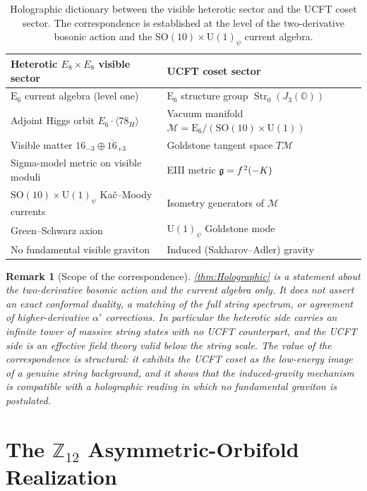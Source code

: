 \documentclass[pdflatex,sn-mathphys-num]{sn-jnl}
\theoremstyle{thmstyleone}
\theoremstyle{thmstyletwo}%
\newtheorem{remark}{Remark}%
\theoremstyle{thmstylethree}%
\newcommand{\SO}[1]{\mathrm{SO(#1)}}
\newcommand{\U}[1]{\mathrm{U(#1)}}
\newcommand{\E}[1]{\mathrm{E_{#1}}}
\newcommand{\M}{\mathcal{M}}
\newcommand{\jalg}{J_3(\mathbb{O})}
\newcommand{\SOTen}{\SO{10}}
\newcommand{\UOne}{\U{1}}
\newcommand{\ESix}{\E{6}}
\newcommand{\SOTenXUOne}{\SOTen \times \UOne}
\newcommand{\MCosetInline}{\ESix/(\SOTenXUOne)}
\newcommand{\sm}{\hspace{.065em}}
\newcommand{\Str}{\operatorname{Str}}
\newcommand{\smexp}[1]{^{\sm #1}}
\begin{document}
\begin{table}[t]
\centering
\caption{Holographic dictionary between the visible heterotic sector and the
UCFT coset sector.  The correspondence is established at the level of the
two-derivative bosonic action and the $\SOTen\times\UOne_\psi$ current algebra.}
\label{tab:Dictionary}
\begin{tabular}{@{}ll@{}}
\toprule
Heterotic $E_{8}\times E_{8}$ visible sector & UCFT coset sector \\
\midrule
$\ESix$ current algebra (level one)          & $\ESix$ structure group $\Str_0(\jalg)$ \\
Adjoint Higgs orbit $E_{6}\cdot\langle78_H\rangle$ & Vacuum manifold $\M=\MCosetInline$ \\
Visible matter $16_{-3}\oplus\overline{16}_{+3}$    & Goldstone tangent space $T\M$ \\
Sigma-model metric on visible moduli          & EIII metric $\mathfrak g=f\smexp{2}(-K)$ \\
$\SOTen\times\UOne_\psi$ Ka\v{c}--Moody currents & Isometry generators of $\M$ \\
Green--Schwarz axion                          & $\UOne_\psi$ Goldstone mode \\
No fundamental visible graviton               & Induced (Sakharov--Adler) gravity \\
\bottomrule
\end{tabular}
\end{table}

\begin{remark}[Scope of the correspondence]
\label{rmk:HolographicScope}
\autoref{thm:Holographic} is a statement about the two-derivative bosonic action
and the current algebra only.  It does not assert an exact conformal duality, a
matching of the full string spectrum, or agreement of higher-derivative
$\alpha'$ corrections.  In particular the heterotic side carries an infinite
tower of massive string states with no UCFT counterpart, and the UCFT side is an
effective field theory valid below the string scale.  The value of the
correspondence is structural: it exhibits the UCFT coset as the low-energy image
of a genuine string background, and it shows that the induced-gravity mechanism
is compatible with a holographic reading in which no fundamental graviton is
postulated.
\end{remark}


\section{The $\mathbb Z_{12}$ Asymmetric-Orbifold Realization}
\label{sec:Z12}
\end{document}

